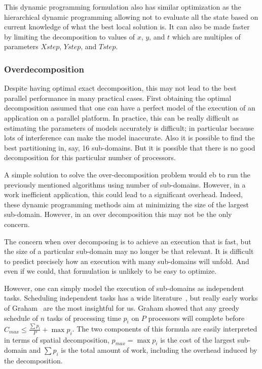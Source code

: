 \documentclass{article}
\begin{document}
This dynamic programming formulation also has similar optimization as
the hierarchical dynamic programming allowing not to evaluate all the
state based on current knowledge of what the best local solution
is. It can also be made faster by limiting the decomposition to values
of $x$, $y$, and $t$ which are multiples of parameters $Xstep$,
$Ystep$, and $Tstep$.

\subsubsection{Overdecomposition}
\label{sec:overdecomposition}

Despite having optimal exact decomposition, this may not lead to the
best parallel performance in many practical cases. First obtaining the
optimal decomposition assumed that one can have a perfect model of the
execution of an application on a parallel platform. In practice, this
can be really difficult as estimating the parameters of models
accurately is difficult; in particular because lots of interference
can make the model inaccurate.
Also it is possible to find the best partitioning in, say, 16
sub-domains. But it is possible that there is no good decomposition for
this particular number of processors.

A simple solution to solve the over-decomposition problem would eb to
run the previously mentioned algorithms using number of
sub-domains. However, in a work inefficient application, this could
lead to a significant overhead. Indeed, these dynamic programming
methods aim at minimizing the size of the largest sub-domain. However,
in an over decomposition this may not be the only concern.

The concern when over decomposing is to achieve an execution that is
fast, but the size of a particular sub-domain may no longer be that
relevant. It is difficult to predict precisely how an execution with
many sub-domains will unfold. And even if we could, that formulation is
unlikely to be easy to optimize.

However, one can simply model the execution of sub-domains as
independent tasks. Scheduling independent tasks has a wide
literature~\cite{handbook}, but really early works of Graham~\cite{Graham66} are the
most insightful for us. Graham showed that any greedy schedule of $n$
tasks of processing time $p_i$ on $P$ processors will complete before
$C_{max} \leq \frac{\sum p_i}{P} + \max p_i$. The two components of
this formula are easily interpreted in terms of spatial decomposition,
$p_{max} = \max p_i$ is the cost of the largest sub-domain and $\sum p_i$ is the
total amount of work, including the overhead induced by the
decomposition.
\end{document}
